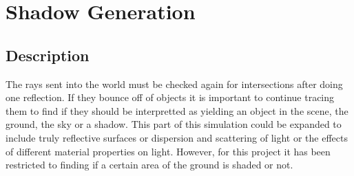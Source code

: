 \documentclass{article}
\begin{document}
\section{Shadow Generation}
\subsection{Description}
The rays sent into the world must be checked again for intersections after doing one reflection. If they bounce off of objects it is
important to continue tracing them to find if they should be interpretted as yielding an object in the scene, the ground, the sky or 
a shadow. This part of this simulation could be expanded to include truly reflective surfaces or dispersion and scattering of light
or the effects of different material properties on light. However, for this project it has been restricted to finding if a certain
area of the ground is shaded or not.
\end{document}
